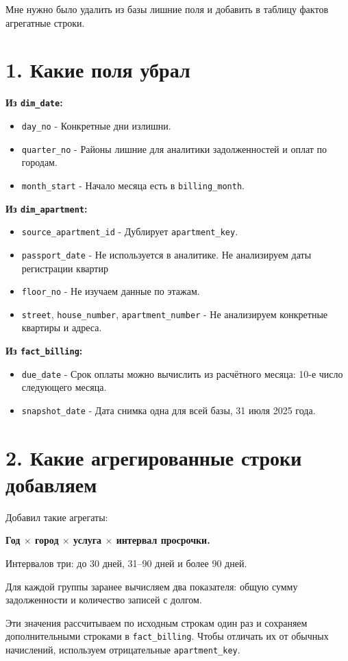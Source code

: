 \documentclass[12pt]{article}
\begin{document}
Мне нужно было удалить из базы лишние поля и добавить в таблицу фактов агрегатные строки.

\section*{1. Какие поля убрал}

\noindent\textbf{Из \texttt{dim\_date}:}
\begin{itemize}
    \item \texttt{day\_no} - Конкретные дни излишни.
    \item \texttt{quarter\_no} - Районы лишние для аналитики задолженностей и оплат по городам.
    \item \texttt{month\_start} - Начало месяца есть в \texttt{billing\_month}.
\end{itemize}

\noindent\textbf{Из \texttt{dim\_apartment}:}
\begin{itemize}
    \item \texttt{source\_apartment\_id} - Дублирует \texttt{apartment\_key}.
    \item \texttt{passport\_date} - Не используется в аналитике. Не анализируем даты регистрации квартир
    \item \texttt{floor\_no} - Не изучаем данные по этажам.
    \item \texttt{street}, \texttt{house\_number}, \texttt{apartment\_number} - Не анализируем конкретные квартиры и адреса.
\end{itemize}

\noindent\textbf{Из \texttt{fact\_billing}:}
\begin{itemize}
    \item \texttt{due\_date} - Срок оплаты можно вычислить из расчётного месяца: 10-е число следующего месяца.
    \item \texttt{snapshot\_date} - Дата снимка одна для всей базы, 31 июля 2025 года.
\end{itemize}

\section*{2. Какие агрегированные строки добавляем}

Добавил такие агрегаты:

\begin{center}
\textbf{Год $\times$ город $\times$ услуга $\times$ интервал просрочки.}
\end{center}

Интервалов три: до 30 дней, 31--90 дней и более 90 дней.

Для каждой группы заранее вычисляем два показателя: общую сумму задолженности и количество записей с долгом.

Эти значения рассчитываем по исходным строкам один раз и сохраняем дополнительными строками в \texttt{fact\_billing}. Чтобы отличать их от обычных начислений, используем отрицательные \texttt{apartment\_key}.
\end{document}
